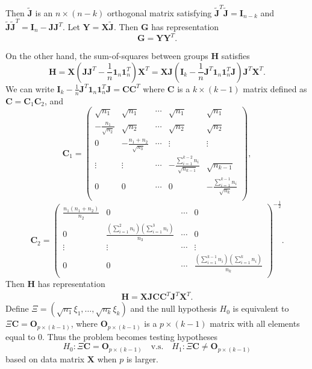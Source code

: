 \documentclass[12pt]{article} %
\newcommand{\bX}{\mathbf{X}}
\newcommand{\bY}{\mathbf{Y}}
\newcommand{\bH}{\mathbf{H}}
\newcommand{\bG}{\mathbf{G}}
\newcommand{\bJ}{\mathbf{J}}
\newcommand{\bC}{\mathbf{C}}
\newcommand{\bO}{\mathbf{O}}
\newcommand{\bI}{\mathbf{I}}
\theoremstyle{definition}
\begin{document}
Then $\tilde{\bJ}$ is an $n\times (n-k)$ orthogonal matrix  satisfying $\tilde{\bJ}^T\tilde{\bJ}=\bI_{n-k}$ and $\tilde{\bJ}\tilde{\bJ}^T =\bI_n-\bJ\bJ^T$.
Let $\bY=\bX\tilde{\bJ}$.
Then $\bG$ has representation
$$\bG=
\bY \bY^T.
$$

On the other hand, the sum-of-squares between groups $\bH$ satisfies
$$
        \bH=\bX(\bJ\bJ^T-\frac{1}{n}\mathbf{1}_n\mathbf{1}_n^T)\bX^T
=\bX \bJ(\bI_k-\frac{1}{n}\bJ^T\mathbf{1}_n \mathbf{1}_n^T \bJ)\bJ^T \bX^T.
$$
We can write $\bI_k-\frac{1}{n}\bJ^T\mathbf{1}_n \mathbf{1}_n^T \bJ=\bC\bC^T$
where $\bC$ is a $k\times (k-1)$ matrix defined as $\bC=\bC_1\bC_2$, and
 $$
\bC_1=\begin{pmatrix}
    \sqrt{n_1}&\sqrt{n_1}&\cdots&\sqrt{n_1}&\sqrt{n_1}\\
    -\frac{n_1}{\sqrt{n_2}}&\sqrt{n_2}&\cdots&\sqrt{n_2}&\sqrt{n_2}\\
    0&-\frac{n_1+n_2}{\sqrt{n_3}}&\cdots&\vdots&\vdots\\
    \vdots&\vdots&\cdots&-\frac{\sum_{i=1}^{k-2}n_i}{\sqrt{n_{k-1}}}&\sqrt{n_{k-1}}\\
    0&0&\cdots&0&-\frac{\sum_{i=1}^{k-1}n_i}{\sqrt{n_k}}\\
\end{pmatrix},
 $$
 $$
\bC_2=\begin{pmatrix}
    \frac{n_1(n_1+n_2)}{n_2}&0&\cdots&0\\
    0&\frac{(\sum_{i=1}^2 n_i)(\sum_{i=1}^3 n_i)}{n_3}&\cdots&0\\
    \vdots&\vdots&\cdots&\vdots\\
    0&0&\cdots&\frac{(\sum_{i=1}^{k-1} n_i)(\sum_{i=1}^k n_i)}{n_{k}}\\
\end{pmatrix}^{-\frac{1}{2}}.
$$
Then $\bH$ has representation
\begin{equation*}
    \begin{aligned}
        \bH=\bX \bJ\bC \bC^T \bJ^T \bX^T.
    \end{aligned}
\end{equation*}
 Define $\Xi=(\sqrt{n_1}\xi_1,\ldots,\sqrt{n_k}\xi_k)$
 and the null hypothesis $H_0$ is equivalent to $\Xi \bC=\bO_{p\times (k-1)}$, where $\bO_{p\times (k-1)}$ is a $p\times (k-1)$ matrix with all elements equal to $0$.
 Thus the problem becomes testing hypotheses
 $$
 H_0:\Xi \bC=\bO_{p\times (k-1)}\quad \text{v.s.}\quad H_1: \Xi \bC\neq \bO_{p\times (k-1)}
 $$
 based on data matrix $\bX$ when $p$ is larger.
\end{document}
